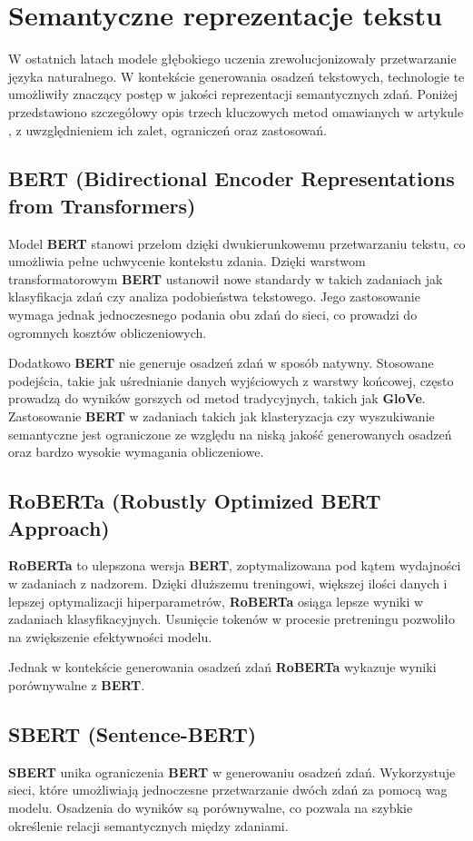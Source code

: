 \section{Semantyczne reprezentacje tekstu}
W ostatnich latach modele głębokiego uczenia zrewolucjonizowały przetwarzanie
języka naturalnego. W kontekście generowania osadzeń tekstowych,
technologie te umożliwiły znaczący postęp w jakości reprezentacji
semantycznych zdań. Poniżej przedstawiono szczegółowy opis trzech
kluczowych metod omawianych w artykule \cite{DBLP_Gurevych}, z uwzględnieniem ich zalet, ograniczeń oraz zastosowań.

\subsection{BERT (Bidirectional Encoder Representations from Transformers)}
Model \textbf{BERT} stanowi przełom dzięki dwukierunkowemu przetwarzaniu
tekstu, co umożliwia pełne uchwycenie kontekstu zdania. Dzięki warstwom
transformatorowym \textbf{BERT} ustanowił nowe standardy w takich zadaniach jak
klasyfikacja zdań czy analiza podobieństwa tekstowego. Jego
zastosowanie wymaga jednak jednoczesnego podania obu zdań do sieci, co
prowadzi do ogromnych kosztów obliczeniowych.

Dodatkowo \textbf{BERT} nie generuje osadzeń zdań w sposób natywny.
Stosowane podejścia, takie jak uśrednianie danych wyjściowych z warstwy końcowej, często prowadzą do
wyników gorszych od metod tradycyjnych, takich jak \textbf{GloVe}. Zastosowanie
\textbf{BERT} w zadaniach takich jak klasteryzacja czy wyszukiwanie semantyczne
jest ograniczone ze względu na niską jakość generowanych osadzeń oraz
bardzo wysokie wymagania obliczeniowe.

\subsection{RoBERTa (Robustly Optimized BERT Approach)}
\textbf{RoBERTa} to ulepszona wersja \textbf{BERT}, zoptymalizowana pod kątem wydajności w
zadaniach z nadzorem. Dzięki dłuższemu treningowi, większej ilości
danych i lepszej optymalizacji hiperparametrów, \textbf{RoBERTa} osiąga lepsze
wyniki w zadaniach klasyfikacyjnych. Usunięcie tokenów w procesie pretreningu pozwoliło na zwiększenie efektywności
modelu.

Jednak w kontekście generowania osadzeń zdań \textbf{RoBERTa} wykazuje wyniki
porównywalne z \textbf{BERT}.

\subsection{SBERT (Sentence-BERT)}
\textbf{SBERT} unika ograniczenia \textbf{BERT} w generowaniu osadzeń zdań.
Wykorzystuje sieci, które umożliwiają jednoczesne przetwarzanie dwóch zdań za pomocą wag modelu. Osadzenia do wyników są porównywalne, co pozwala na szybkie określenie relacji
semantycznych między zdaniami.

